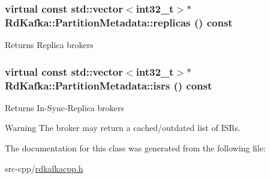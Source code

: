 \hypertarget{classRdKafka_1_1PartitionMetadata_ae7b6c860ea5d487d23616976cbe1a859}{
\subsubsection[{replicas}]{\setlength{\rightskip}{0pt plus 5cm}virtual const std::vector$<$int32\_\-t$>$$\ast$ RdKafka::PartitionMetadata::replicas () const}}
\label{classRdKafka_1_1PartitionMetadata_ae7b6c860ea5d487d23616976cbe1a859}
\begin{DoxyReturn}{Returns}
Replica brokers 
\end{DoxyReturn}
\hypertarget{classRdKafka_1_1PartitionMetadata_acf801e001bec20102cd08119d6d73d88}{
\subsubsection[{isrs}]{\setlength{\rightskip}{0pt plus 5cm}virtual const std::vector$<$int32\_\-t$>$$\ast$ RdKafka::PartitionMetadata::isrs () const}}
\label{classRdKafka_1_1PartitionMetadata_acf801e001bec20102cd08119d6d73d88}
\begin{DoxyReturn}{Returns}
In-\/Sync-\/Replica brokers 
\end{DoxyReturn}
\begin{DoxyWarning}{Warning}
The broker may return a cached/outdated list of ISRs. 
\end{DoxyWarning}


The documentation for this class was generated from the following file:\begin{DoxyCompactItemize}
\item 
src-\/cpp/\hyperlink{rdkafkacpp_8h}{rdkafkacpp.h}\end{DoxyCompactItemize}
